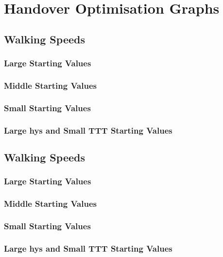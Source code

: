 \chapter{Handover Optimisation Graphs}
\section{Walking Speeds}\label{ap:walk}
\subsection{Large Starting Values}\label{ap:walk_large}
\subsection{Middle Starting Values}\label{ap:walk_mid}
\subsection{Small Starting Values}\label{ap:walk_low}
\subsection{Large hys and Small TTT Starting Values}\label{ap:walk_highhys}
\section{Walking Speeds}\label{ap:veh}
\subsection{Large Starting Values}\label{ap:veh_large}
\subsection{Middle Starting Values}\label{ap:veh_mid}
\subsection{Small Starting Values}\label{ap:veh_low}
\subsection{Large hys and Small TTT Starting Values}\label{ap:veh_highhys}